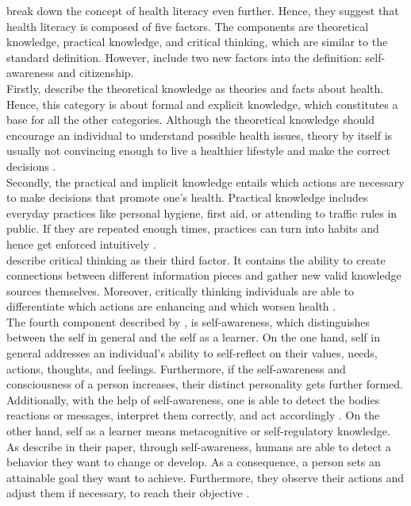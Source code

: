 \textcite{paakkari2012health} break down the concept of health literacy even further. Hence, they suggest that health literacy is composed of five factors. The components are theoretical knowledge, practical knowledge, and critical thinking, which are similar to the standard definition. However, \textcite{paakkari2012health} include two new factors into the definition: self-awareness and citizenship. \\
Firstly, \textcite{paakkari2012health} describe the theoretical knowledge as theories and facts about health. Hence, this category is about formal and explicit knowledge, which constitutes a base for all the other categories. Although the theoretical knowledge should encourage an individual to understand possible health issues, theory by itself is usually not convincing enough to live a healthier lifestyle and make the correct decisions \autocite{paakkari2012health}. \\
Secondly, the practical and implicit knowledge entails which actions are necessary to make decisions that promote one's health. Practical knowledge includes everyday practices like personal hygiene, first aid, or attending to traffic rules in public. If they are repeated enough times, practices can turn into habits and hence get enforced intuitively \autocite{paakkari2012health}.  \\
\textcite{paakkari2012health} describe critical thinking as their third factor. It contains the ability to create connections between different information pieces and gather new valid knowledge sources themselves. Moreover, critically thinking individuals are able to differentiate which actions are enhancing and which worsen health \autocite{paakkari2012health}. \\
The fourth component described by \textcite{paakkari2012health}, is self-awareness, which distinguishes between the self in general and the self as a learner.
On the one hand, self in general addresses an individual's ability to self-reflect on their values, needs, actions, thoughts, and feelings. Furthermore, if the self-awareness and consciousness of a person increases, their distinct personality gets further formed. 
Additionally, with the help of self-awareness, one is able to detect the bodies reactions or messages, interpret them correctly, and act accordingly \autocite{paakkari2012health}.
On the other hand, self as a learner means metacognitive or self-regulatory knowledge. As \textcite{paakkari2012health} describe in their paper, through self-awareness, humans are able to detect a behavior they want to change or develop. As a consequence, a person sets an attainable goal they want to achieve. Furthermore, they observe their actions and adjust them if necessary, to reach their objective \autocite{paakkari2012health}.   \\
